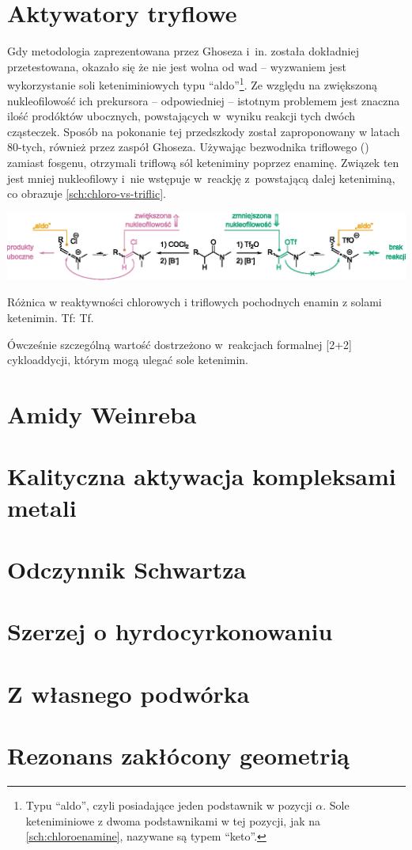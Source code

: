 \section{Aktywatory tryflowe}
Gdy metodologia zaprezentowana przez Ghoseza i~in. została dokładniej przetestowana, okazało się że nie jest wolna od wad \---
wyzwaniem jest wykorzystanie soli keteniminiowych typu \enquote{aldo}\footnote{%
  Typu \enquote{aldo}, czyli posiadające jeden podstawnik w pozycji $\alpha$.
  Sole keteniminiowe z dwoma podstawnikami w tej pozycji, jak na \cref{sch:chloroenamine}, nazywane są typem \enquote{keto}.
}. Ze względu na zwiększoną nukleofilowość ich prekursora \--- odpowiedniej  \---
istotnym problemem jest znaczna ilość prodóktów ubocznych, powstających w~wyniku reakcji tych dwóch cząsteczek.
Sposób na pokonanie tej przedszkody został zaproponowany w latach 80-tych, również przez zaspół Ghoseza.
Używając bezwodnika triflowego () zamiast fosgenu, otrzymali triflową sól keteniminy poprzez enaminę.\autocite{ghosez81}
Związek ten jest mniej nukleofilowy i~nie wstępuje w~reackję z~powstającą dalej keteniminą, co obrazuje \cref{sch:chloro-vs-triflic}.
\begin{scheme*}
  \centering
  \includegraphics{schemes/chloro-vs-triflic}
  \caption{Różnica w reaktywności chlorowych i triflowych pochodnych enamin z solami ketenimin. \acrshort{Tf}: \acrlong{Tf}.}
  \label{sch:chloro-vs-triflic}
\end{scheme*}

Ówcześnie szczególną wartość dostrzeżono w~reakcjach formalnej [2+2] cykloaddycji, którym mogą ulegać sole ketenimin.


\section{Amidy Weinreba}


\section{Kalityczna aktywacja kompleksami metali}

\section{Odczynnik Schwartza}

\section{Szerzej o hyrdocyrkonowaniu}

\section{Z własnego podwórka}

\section{Rezonans zakłócony geometrią}